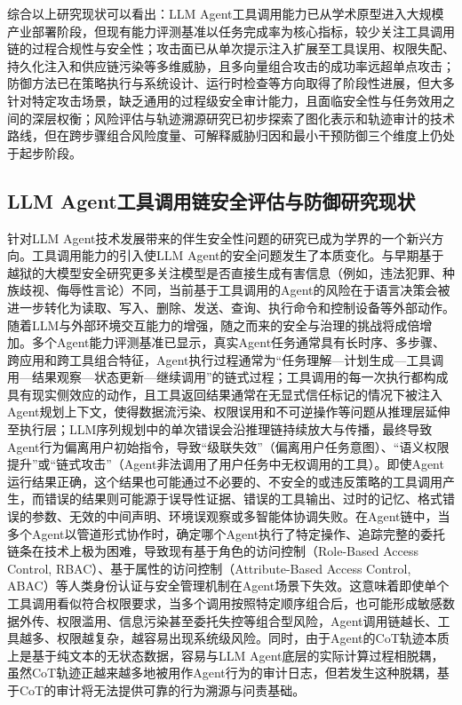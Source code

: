 综合以上研究现状可以看出：LLM Agent工具调用能力已从学术原型进入大规模产业部署阶段，但现有能力评测基准以任务完成率为核心指标，较少关注工具调用链的过程合规性与安全性；攻击面已从单次提示注入扩展至工具误用、权限失配、持久化注入和供应链污染等多维威胁，且多向量组合攻击的成功率远超单点攻击；防御方法已在策略执行与系统设计、运行时检查等方向取得了阶段性进展，但大多针对特定攻击场景，缺乏通用的过程级安全审计能力，且面临安全性与任务效用之间的深层权衡；风险评估与轨迹溯源研究已初步探索了图化表示和轨迹审计的技术路线，但在跨步骤组合风险度量、可解释威胁归因和最小干预防御三个维度上仍处于起步阶段。

\subsection{LLM Agent工具调用链安全评估与防御研究现状}

针对LLM Agent技术发展带来的伴生安全性问题的研究已成为学界的一个新兴方向。工具调用能力的引入使LLM Agent的安全问题发生了本质变化。与早期基于越狱的大模型安全研究\cite{wei2023jailbreak,zou2023universal,mehrotra2024tree,ding2024wolf,chao2025jailbreaking,andriushchenko2025jailbreaking}更多关注模型是否直接生成有害信息（例如，违法犯罪、种族歧视、侮辱性言论）不同，当前基于工具调用的Agent的风险在于语言决策会被进一步转化为读取、写入、删除、发送、查询、执行命令和控制设备等外部动作。随着LLM与外部环境交互能力的增强，随之而来的安全与治理的挑战将成倍增加\cite{weidinger2022taxonomy}。多个Agent能力评测基准\cite{zhou2023webarena,deng2023mind2web,xie2024osworld,qin2024toolllm,bonatti2025windows}已显示，真实Agent任务通常具有长时序、多步骤、跨应用和跨工具组合特征，Agent执行过程通常为“任务理解—计划生成—工具调用—结果观察—状态更新—继续调用”的链式过程；工具调用的每一次执行都构成具有现实侧效应的动作，且工具返回结果通常在无显式信任标记的情况下被注入Agent规划上下文，使得数据流污染、权限误用和不可逆操作等问题从推理层延伸至执行层\cite{chu2026systematic}；LLM序列规划中的单次错误会沿推理链持续放大与传播，最终导致Agent行为偏离用户初始指令，导致“级联失效”（偏离用户任务意图）\cite{deng2025agentsunderthreat}、“语义权限提升”或“链式攻击”（Agent非法调用了用户任务中无权调用的工具）\cite{chu2026systematic,dewitt2026openchallenges}。即使Agent运行结果正确，这个结果也可能通过不必要的、不安全的或违反策略的工具调用产生，而错误的结果则可能源于误导性证据、错误的工具输出、过时的记忆、格式错误的参数、无效的中间声明、环境误观察或多智能体协调失败\cite{wang2026fromagenttraces}。在Agent链中，当多个Agent以管道形式协作时，确定哪个Agent执行了特定操作、追踪完整的委托链条在技术上极为困难，导致现有基于角色的访问控制（Role-Based Access Control, RBAC）、基于属性的访问控制（Attribute-Based Access Control, ABAC）等人类身份认证与安全管理机制在Agent场景下失效\cite{dewitt2026openchallenges}。这意味着即使单个工具调用看似符合权限要求，当多个调用按照特定顺序组合后，也可能形成敏感数据外传、权限滥用、信息污染甚至委托失控等组合型风险，Agent调用链越长、工具越多、权限越复杂，越容易出现系统级风险。同时，由于Agent的CoT轨迹本质上是基于纯文本的无状态数据，容易与LLM Agent底层的实际计算过程相脱耦，虽然CoT轨迹正越来越多地被用作Agent行为的审计日志，但若发生这种脱耦，基于CoT的审计将无法提供可靠的行为溯源与问责基础\cite{chu2026systematic}。

